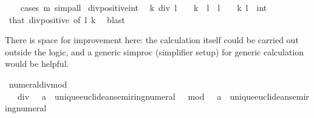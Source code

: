 \begin{isabellebody}
%
\isadelimproof
\ \ %
\endisadelimproof
%
\isatagproof
{}\isamarkupfalse%
\ {\isacharparenleft}{\kern0pt}cases\ m{\isacharparenright}{\kern0pt}\ simp{\isacharunderscore}{\kern0pt}all%
\endisatagproof
{\isafoldproof}%
%
\isadelimproof
\isanewline
%
\endisadelimproof
\isanewline
{}\isamarkupfalse%
\ div{\isacharunderscore}{\kern0pt}positive{\isacharunderscore}{\kern0pt}int{\isacharcolon}{\kern0pt}\isanewline
\ \ {\isachardoublequoteopen}k\ div\ l\ {\isachargreater}{\kern0pt}\ {}{\isachardoublequoteclose}\ \ {\isachardoublequoteopen}k\ {\isasymge}\ l{\isachardoublequoteclose}\ \ {\isachardoublequoteopen}l\ {\isachargreater}{\kern0pt}\ {}{\isachardoublequoteclose}\ \ k\ l\ {\isacharcolon}{\kern0pt}{\isacharcolon}{\kern0pt}\ int\isanewline
%
\isadelimproof
\ \ %
\endisadelimproof
%
\isatagproof
{}\isamarkupfalse%
\ that\ div{\isacharunderscore}{\kern0pt}positive\ {\isacharbrackleft}{\kern0pt}of\ l\ k{\isacharbrackright}{\kern0pt}\ \isamarkupfalse%
\ blast%
\endisatagproof
{\isafoldproof}%
%
\isadelimproof
%
\endisadelimproof
%
\isadelimdocument
%
\endisadelimdocument
%
\isatagdocument
%
\isamarkuptrue%
%
\endisatagdocument
{\isafolddocument}%
%
\isadelimdocument
%
\endisadelimdocument
%
\begin{isamarkuptext}%
There is space for improvement here: the calculation itself
  could be carried out outside the logic, and a generic simproc
  (simplifier setup) for generic calculation would be helpful.%
\end{isamarkuptext}\isamarkuptrue%
%
\isadelimML
%
\endisadelimML
%
\isatagML
{}\isamarkupfalse%
\ numeral{\isacharunderscore}{\kern0pt}divmod\isanewline
\ \ {\isacharparenleft}{\kern0pt}{\isachardoublequoteopen}{}\ div\ {}\ {\isacharcolon}{\kern0pt}{\isacharcolon}{\kern0pt}\ {\isacharprime}{\kern0pt}a\ {\isacharcolon}{\kern0pt}{\isacharcolon}{\kern0pt}\ unique{\isacharunderscore}{\kern0pt}euclidean{\isacharunderscore}{\kern0pt}semiring{\isacharunderscore}{\kern0pt}numeral{\isachardoublequoteclose}\ {\isacharbar}{\kern0pt}\ {\isachardoublequoteopen}{}\ mod\ {}\ {\isacharcolon}{\kern0pt}{\isacharcolon}{\kern0pt}\ {\isacharprime}{\kern0pt}a\ {\isacharcolon}{\kern0pt}{\isacharcolon}{\kern0pt}\ unique{\isacharunderscore}{\kern0pt}euclidean{\isacharunderscore}{\kern0pt}semiring{\isacharunderscore}{\kern0pt}numeral{\isachardoublequoteclose}\ {\isacharbar}{\kern0pt}\isanewline

\end{isabellebody}
